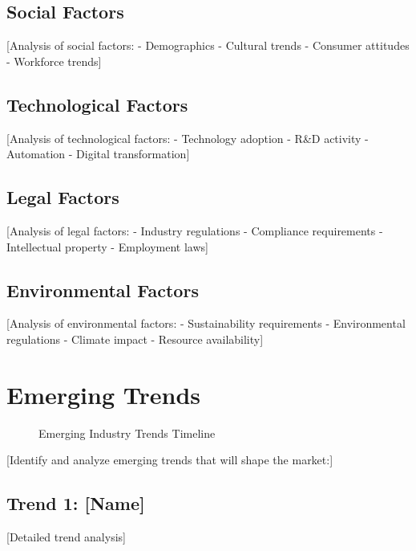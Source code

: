 \documentclass[11pt,letterpaper]{report}
\begin{document}
\subsection{Social Factors}
[Analysis of social factors:
- Demographics
- Cultural trends
- Consumer attitudes
- Workforce trends]

\subsection{Technological Factors}
[Analysis of technological factors:
- Technology adoption
- R\&D activity
- Automation
- Digital transformation]

\subsection{Legal Factors}
[Analysis of legal factors:
- Industry regulations
- Compliance requirements
- Intellectual property
- Employment laws]

\subsection{Environmental Factors}
[Analysis of environmental factors:
- Sustainability requirements
- Environmental regulations
- Climate impact
- Resource availability]

\section{Emerging Trends}


\begin{figure}[htbp]
\centering
\caption{Emerging Industry Trends Timeline}
\label{fig:trends}
\end{figure}

[Identify and analyze emerging trends that will shape the market:]

\subsection{Trend 1: [Name]}
[Detailed trend analysis]
\end{document}
